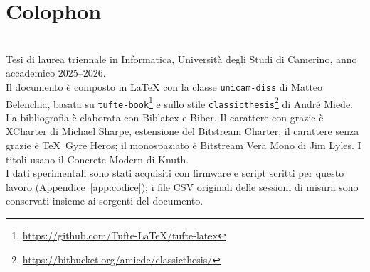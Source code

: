 \thispagestyle{empty}
\hphantom{.}
\vfill

\section*{Colophon}
\textit{\TitleText}\\
Tesi di laurea triennale in Informatica, Universit\`a degli Studi di Camerino,
anno accademico 2025--2026.\\[0.5\baselineskip]
%
Il documento \`e composto in \LaTeX{} con la classe \texttt{unicam-diss} di Matteo
Belenchia, basata su \texttt{tufte-book}\footnote{\url{https://github.com/Tufte-LaTeX/tufte-latex}}
e sullo stile \texttt{classicthesis}\footnote{\url{https://bitbucket.org/amiede/classicthesis/}}
di Andr\'e Miede.\\[0.5\baselineskip]
%
La bibliografia \`e elaborata con Biblatex e Biber. Il carattere con grazie \`e
XCharter di Michael Sharpe, estensione del Bitstream Charter; il carattere senza
grazie \`e \TeX\ Gyre Heros; il monospaziato \`e Bitstream Vera Mono di Jim Lyles.
I titoli usano il Concrete Modern di Knuth.\\[0.5\baselineskip]
%
I dati sperimentali sono stati acquisiti con firmware e script scritti per questo
lavoro (Appendice~\ref{app:codice}); i file CSV originali delle sessioni di misura
sono conservati insieme ai sorgenti del documento.
